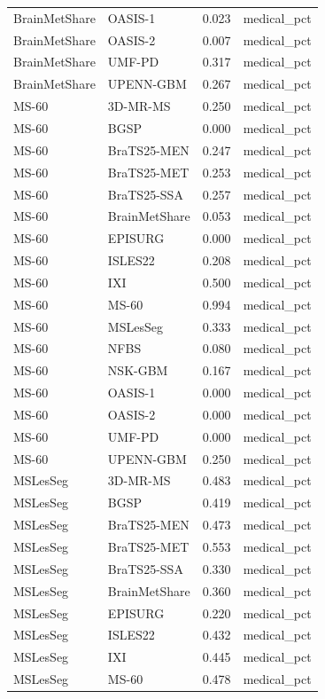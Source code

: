 \begin{tabular}{llrl}
BrainMetShare & OASIS-1 & 0.023 & medical\_pct \\
BrainMetShare & OASIS-2 & 0.007 & medical\_pct \\
BrainMetShare & UMF-PD & 0.317 & medical\_pct \\
BrainMetShare & UPENN-GBM & 0.267 & medical\_pct \\
MS-60 & 3D-MR-MS & 0.250 & medical\_pct \\
MS-60 & BGSP & 0.000 & medical\_pct \\
MS-60 & BraTS25-MEN & 0.247 & medical\_pct \\
MS-60 & BraTS25-MET & 0.253 & medical\_pct \\
MS-60 & BraTS25-SSA & 0.257 & medical\_pct \\
MS-60 & BrainMetShare & 0.053 & medical\_pct \\
MS-60 & EPISURG & 0.000 & medical\_pct \\
MS-60 & ISLES22 & 0.208 & medical\_pct \\
MS-60 & IXI & 0.500 & medical\_pct \\
MS-60 & MS-60 & 0.994 & medical\_pct \\
MS-60 & MSLesSeg & 0.333 & medical\_pct \\
MS-60 & NFBS & 0.080 & medical\_pct \\
MS-60 & NSK-GBM & 0.167 & medical\_pct \\
MS-60 & OASIS-1 & 0.000 & medical\_pct \\
MS-60 & OASIS-2 & 0.000 & medical\_pct \\
MS-60 & UMF-PD & 0.000 & medical\_pct \\
MS-60 & UPENN-GBM & 0.250 & medical\_pct \\
MSLesSeg & 3D-MR-MS & 0.483 & medical\_pct \\
MSLesSeg & BGSP & 0.419 & medical\_pct \\
MSLesSeg & BraTS25-MEN & 0.473 & medical\_pct \\
MSLesSeg & BraTS25-MET & 0.553 & medical\_pct \\
MSLesSeg & BraTS25-SSA & 0.330 & medical\_pct \\
MSLesSeg & BrainMetShare & 0.360 & medical\_pct \\
MSLesSeg & EPISURG & 0.220 & medical\_pct \\
MSLesSeg & ISLES22 & 0.432 & medical\_pct \\
MSLesSeg & IXI & 0.445 & medical\_pct \\
MSLesSeg & MS-60 & 0.478 & medical\_pct \\

\end{tabular}
